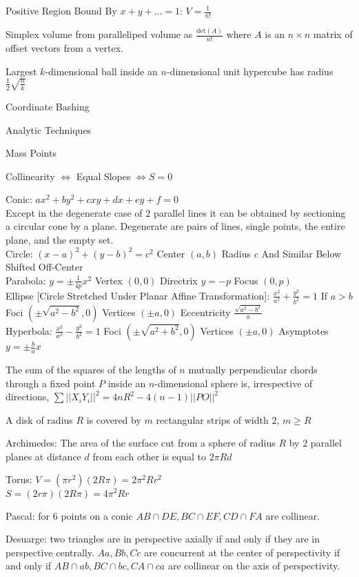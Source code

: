 Positive Region Bound By $x+y+\dots=1$: $V=\frac{1}{n!}$

Simplex volume from paralleliped volume as $\frac{\text{det}(A)}{n!}$ where $A$ is an $n \times n$ matrix of offset vectors from a vertex.

Largest $k$-dimensional ball inside an $n$-dimensional unit hypercube has radius $\frac{1}{2}\sqrt{\frac{n}{k}}$

Coordinate Bashing

Analytic Techniques

Mass Points

Collinearity $\iff$ Equal Slopes $\iff S=0$

Conic: $ax^2+by^2+cxy+dx+ey+f=0$ \\
Except in the degenerate case of $2$ parallel lines it can be obtained by sectioning a circular cone by a plane. Degenerate are pairs of lines, single points, the entire plane, and the empty set. \\
Circle: $(x-a)^2+(y-b)^2=c^2$ Center $(a,b)$ Radius $c$ And Similar Below Shifted Off-Center \\
Parabola: $y=\pm \frac{1}{4p}x^2$ Vertex $(0,0)$ Directrix $y=-p$ Focus $(0,p)$ \\
Ellipse [Circle Stretched Under Planar Affine Transformation]: $\frac{x^2}{a^2}+\frac{y^2}{b^2}=1$ If $a>b$ Foci $(\pm \sqrt{a^2-b^2},0)$ Vertices $(\pm a,0)$ Eccentricity $\frac{\sqrt{a^2-b^2}}{a}$ \\
Hyperbola: $\frac{x^2}{a^2}-\frac{y^2}{b^2}=1$ Foci $(\pm \sqrt{a^2+b^2},0)$ Vertices $(\pm a,0)$ Asymptotes $y=\pm\frac{b}{a}x$

The sum of the squares of the lengths of $n$ mutually perpendicular chords through a fixed point $P$ inside an $n$-dimensional sphere is, irrespective of directions, $\sum ||X_iY_i||^2 = 4nR^2 - 4(n-1)||PO||^2$

A disk of radius $R$ is covered by $m$ rectangular strips of width $2$, $m \ge R$

Archimedes: The area of the surface cut from a sphere of radius $R$ by $2$ parallel planes at distance $d$ from each other is equal to $2 \pi R d$

Torus: $V=(\pi r^2)(2R\pi)=2\pi^2 Rr^2$ \\
$S=(2r\pi)(2R\pi)=4\pi^2 Rr$

Pascal: for $6$ points on a conic $AB \cap DE,BC \cap EF,CD \cap FA$ are collinear.

Desuarge: two triangles are in perspective axially if and only if they are in perspective centrally. $Aa,Bb,Cc$ are concurrent at the center of perspectivity if and only if $AB \cap ab,BC \cap bc,CA \cap ca$ are collinear on the axis of perspectivity.

